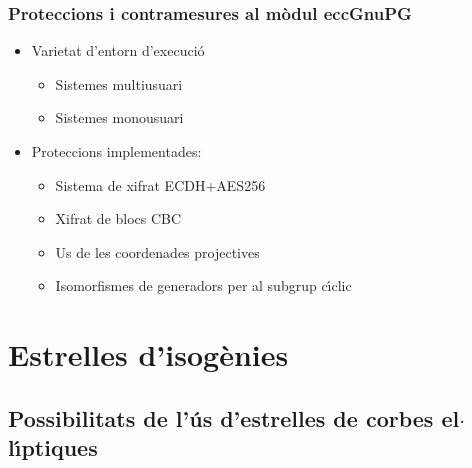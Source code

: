 \documentclass{beamer}
\def\lgem{l\ensuremath{\cdot}l}
\def\ce{corba e\lgem{}\'{\i}ptica}%
\def\ces{corbes e\lgem{}\'{\i}ptiques}%
\def\sgc{subgrup c\'{\i}clic}%
\theoremstyle{saltolinea}   			%
\begin{document}
\begin{frame}
  \frametitle{Proteccions i contramesures al m\`odul eccGnuPG}
  \begin{itemize}
    \item<2-> Varietat d'entorn d'execuci\'o
    \begin{itemize}
      \item<3-> Sistemes multiusuari
      \item<3-> Sistemes monousuari
    \end{itemize}
    \item<4-> Proteccions implementades:
    \begin{itemize}
      \item<5-> Sistema de xifrat ECDH+AES256
      \item<5-> Xifrat de blocs CBC
      \item<5-> Us de les coordenades projectives
      \item<5-> Isomorfismes de generadors per al \sgc
    \end{itemize}
  \end{itemize}
\end{frame}

\section{Estrelles d'isog\`enies}

% 

\subsection{Possibilitats de l'\'us d'estrelles de \ces}
\end{document}
